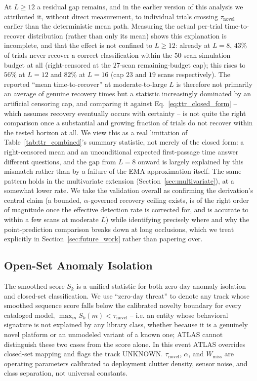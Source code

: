 \documentclass[conference]{IEEEtran}
\begin{document}
At $L \ge 12$ a residual gap remains, and in the earlier version of this analysis we attributed it, without direct measurement, to individual trials crossing $\tau_{\text{novel}}$ earlier than the deterministic mean path. Measuring the actual per-trial time-to-recover distribution (rather than only its mean) shows this explanation is incomplete, and that the effect is not confined to $L\ge12$: already at $L=8$, $43\%$ of trials never recover a correct classification within the $50$-scan simulation budget at all (right-censored at the $27$-scan remaining-budget cap); this rises to $56\%$ at $L=12$ and $82\%$ at $L=16$ (cap $23$ and $19$ scans respectively). The reported ``mean time-to-recover'' at moderate-to-large $L$ is therefore not primarily an average of genuine recovery times but a statistic increasingly dominated by an artificial censoring cap, and comparing it against Eq.~\eqref{eq:ttr_closed_form} -- which assumes recovery eventually occurs with certainty -- is not quite the right comparison once a substantial and growing fraction of trials do not recover within the tested horizon at all. We view this as a real limitation of Table~\ref{tab:ttr_combined}'s summary statistic, not merely of the closed form: a right-censored mean and an unconditional expected first-passage time answer different questions, and the gap from $L=8$ onward is largely explained by this mismatch rather than by a failure of the EMA approximation itself. The same pattern holds in the multivariate extension (Section~\ref{sec:multivariate}), at a somewhat lower rate. We take the validation overall as confirming the derivation's central claim (a bounded, $\alpha$-governed recovery ceiling exists, is of the right order of magnitude once the effective detection rate is corrected for, and is accurate to within a few scans at moderate $L$) while identifying precisely where and why the point-prediction comparison breaks down at long occlusions, which we treat explicitly in Section~\ref{sec:future_work} rather than papering over.

\subsection{Open-Set Anomaly Isolation}
The smoothed score $S_k$ is a unified statistic for both zero-day anomaly isolation and closed-set classification. We use ``zero-day threat'' to denote any track whose smoothed sequence score falls below the calibrated novelty boundary for every cataloged model, $\max_m S_k(m) < \tau_{\text{novel}}$ -- i.e. an entity whose behavioral signature is not explained by any library class, whether because it is a genuinely novel platform or an unmodeled variant of a known one; ATLAS cannot distinguish these two cases from the score alone. In this event ATLAS overrides closed-set mapping and flags the track UNKNOWN. $\tau_{\text{novel}}$, $\alpha$, and $W_{\text{miss}}$ are operating parameters calibrated to deployment clutter density, sensor noise, and class separation, not universal constants.
\end{document}
